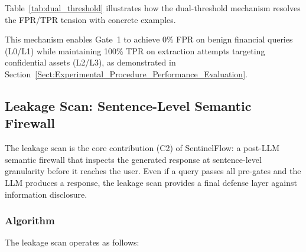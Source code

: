 \documentclass[journal,12pt,onecolumn,draftclsnofoot]{IEEEtran}
\begin{document}
Table~\ref{tab:dual_threshold} illustrates how the dual-threshold mechanism resolves the FPR/TPR tension with concrete examples.

\begin{table}[!ht]
    \centering
    \caption{Dual-Threshold Mechanism: Example Decisions}
    \label{tab:dual_threshold}
\end{table}

This mechanism enables Gate~1 to achieve 0\% FPR on benign financial queries (L0/L1) while maintaining 100\% TPR on extraction attempts targeting confidential assets (L2/L3), as demonstrated in Section~\ref{Sect:Experimental_Procedure_Performance_Evaluation}.

\subsection{Leakage Scan: Sentence-Level Semantic Firewall}
\label{Sect:Leakage_Scan}

The leakage scan is the core contribution (C2) of SentinelFlow: a post-LLM semantic firewall that inspects the generated response at sentence-level granularity before it reaches the user. Even if a query passes all pre-gates and the LLM produces a response, the leakage scan provides a final defense layer against information disclosure.

\subsubsection{Algorithm}

The leakage scan operates as follows:
\end{document}
